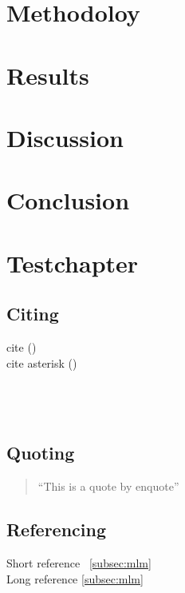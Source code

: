 \documentclass[english]{ttlab-qualify}
\begin{document}
    \chapter{Methodoloy}
    \label{ch:methodology}
    


    \chapter{Results}
    \label{ch:results}
    


    \chapter{Discussion}
    \label{ch:discussion}
    

    \chapter{Conclusion}
    \label{ch:conclusion}
    

    \chapter{\latex Testchapter}
    \section{Citing}
    cite (\cite{METZLER2016})\\
    cite asterisk (\cite*{METZLER2016})\\
    ~\cite{WORDTYPOLOGY}\\
    ~\cite{LINGUISTICTYPOLOGY}\\
    ~\cite{MMM4}\\
    \section{Quoting}
    \begin{quote}
        \enquote{This is a quote by enquote}
    \end{quote}

    \section{Referencing}
    Short reference ~\ref{subsec:mlm}\\
    Long reference \autoref{subsec:mlm}\\

    \appendix
    \printbibliography
\end{document}
